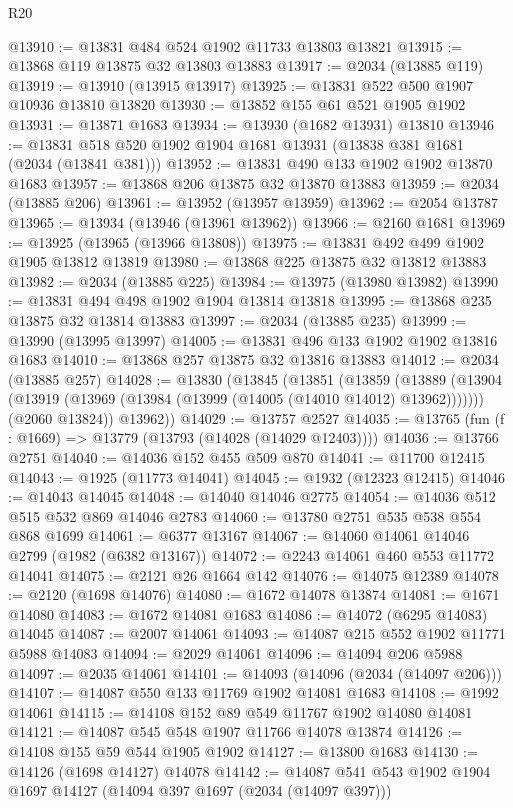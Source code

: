 \begin{lexlean}{R20}
\begin{coremodule}
@13910 := @13831 @484 @524 @1902 @11733 @13803 @13821
@13915 := @13868 @119 @13875 @32 @13803 @13883
@13917 := @2034 (@13885 @119)
@13919 := @13910 (@13915 @13917)
@13925 := @13831 @522 @500 @1907 @10936 @13810 @13820
@13930 := @13852 @155 @61 @521 @1905 @1902
@13931 := @13871 @1683
@13934 := @13930 (@1682 @13931) @13810
@13946 := @13831 @518 @520 @1902 @1904 @1681 @13931 (@13838 @381 @1681 (@2034 (@13841 @381)))
@13952 := @13831 @490 @133 @1902 @1902 @13870 @1683
@13957 := @13868 @206 @13875 @32 @13870 @13883
@13959 := @2034 (@13885 @206)
@13961 := @13952 (@13957 @13959)
@13962 := @2054 @13787
@13965 := @13934 (@13946 (@13961 @13962))
@13966 := @2160 @1681
@13969 := @13925 (@13965 (@13966 @13808))
@13975 := @13831 @492 @499 @1902 @1905 @13812 @13819
@13980 := @13868 @225 @13875 @32 @13812 @13883
@13982 := @2034 (@13885 @225)
@13984 := @13975 (@13980 @13982)
@13990 := @13831 @494 @498 @1902 @1904 @13814 @13818
@13995 := @13868 @235 @13875 @32 @13814 @13883
@13997 := @2034 (@13885 @235)
@13999 := @13990 (@13995 @13997)
@14005 := @13831 @496 @133 @1902 @1902 @13816 @1683
@14010 := @13868 @257 @13875 @32 @13816 @13883
@14012 := @2034 (@13885 @257)
@14028 := @13830
    (@13845
      (@13851
        (@13859
          (@13889 (@13904 (@13919 (@13969 (@13984 (@13999 (@14005 (@14010 @14012) @13962)))))))
          (@2060 @13824))
        @13962))
@14029 := @13757 @2527
@14035 := @13765 (fun (f : @1669) => @13779 (@13793 (@14028 (@14029 @12403))))
@14036 := @13766 @2751
@14040 := @14036 @152 @455 @509 @870
@14041 := @11700 @12415
@14043 := @1925 (@11773 @14041)
@14045 := @1932 (@12323 @12415)
@14046 := @14043 @14045
@14048 := @14040 @14046 @2775
@14054 := @14036 @512 @515 @532 @869 @14046 @2783
@14060 := @13780 @2751 @535 @538 @554 @868 @1699
@14061 := @6377 @13167
@14067 := @14060 @14061 @14046 @2799 (@1982 (@6382 @13167))
@14072 := @2243 @14061 @460 @553 @11772 @14041
@14075 := @2121 @26 @1664 @142
@14076 := @14075 @12389
@14078 := @2120 (@1698 @14076)
@14080 := @1672 @14078 @13874
@14081 := @1671 @14080
@14083 := @1672 @14081 @1683
@14086 := @14072 (@6295 @14083) @14045
@14087 := @2007 @14061
@14093 := @14087 @215 @552 @1902 @11771 @5988 @14083
@14094 := @2029 @14061
@14096 := @14094 @206 @5988
@14097 := @2035 @14061
@14101 := @14093 (@14096 (@2034 (@14097 @206)))
@14107 := @14087 @550 @133 @11769 @1902 @14081 @1683
@14108 := @1992 @14061
@14115 := @14108 @152 @89 @549 @11767 @1902 @14080 @14081
@14121 := @14087 @545 @548 @1907 @11766 @14078 @13874
@14126 := @14108 @155 @59 @544 @1905 @1902
@14127 := @13800 @1683
@14130 := @14126 (@1698 @14127) @14078
@14142 := @14087 @541 @543 @1902 @1904 @1697 @14127 (@14094 @397 @1697 (@2034 (@14097 @397)))

\end{coremodule}
\end{lexlean}
